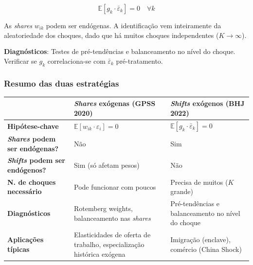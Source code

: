 \documentclass[
]{article}
\begin{document}
\begin{equation}
\mathbb{E}[g_k \cdot \bar{\varepsilon}_k] = 0 \quad \forall k
\label{eq:bhj-id}
\end{equation}

As \emph{shares} \(w_{ik}\) podem ser endógenas. A identificação vem inteiramente da aleatoriedade dos choques, dado que há muitos choques independentes (\(K \to \infty\)).

\textbf{Diagnósticos}: Testes de pré-tendências e balanceamento no nível do choque. Verificar se \(g_k\) correlaciona-se com \(\bar{\varepsilon}_k\) pré-tratamento.

\subsubsection{Resumo das duas estratégias}\label{resumo-das-duas-estratuxe9gias}

\begin{longtable}[]{@{}
  >{\raggedright\arraybackslash}p{}
  >{\raggedright\arraybackslash}p{}
  >{\raggedright\arraybackslash}p{}@{}}
\toprule\noalign{}
\begin{minipage}[b]{\linewidth}\raggedright
\end{minipage} & \begin{minipage}[b]{\linewidth}\raggedright
\textbf{\emph{Shares} exógenas} (GPSS 2020)
\end{minipage} & \begin{minipage}[b]{\linewidth}\raggedright
\textbf{\emph{Shifts} exógenos} (BHJ 2022)
\end{minipage} \\
\midrule\noalign{}
\endhead
\bottomrule\noalign{}
\endlastfoot
\textbf{Hipótese-chave} & \(\mathbb{E}[w_{ik} \cdot \varepsilon_i] = 0\) & \(\mathbb{E}[g_k \cdot \bar{\varepsilon}_k] = 0\) \\
\textbf{\emph{Shares} podem ser endógenas?} & Não & Sim \\
\textbf{\emph{Shifts} podem ser endógenos?} & Sim (só afetam pesos) & Não \\
\textbf{N. de choques necessário} & Pode funcionar com poucos & Precisa de muitos (\(K\) grande) \\
\textbf{Diagnósticos} & Rotemberg weights, balanceamento nas \emph{shares} & Pré-tendências e balanceamento no nível do choque \\
\textbf{Aplicações típicas} & Elasticidades de oferta de trabalho, especialização histórica exógena & Imigração (enclave), comércio (China Shock) \\
\end{longtable}
\end{document}
